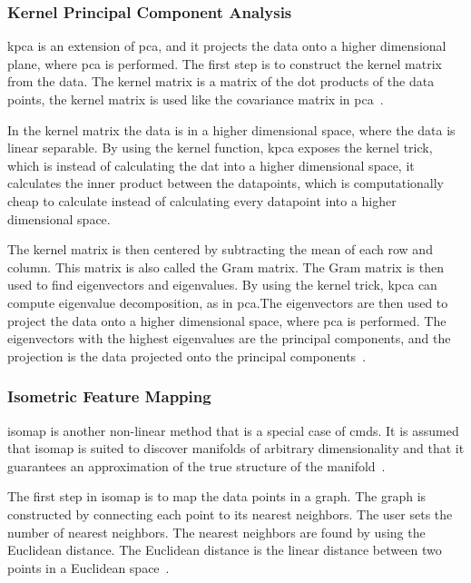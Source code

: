\subsubsection{Kernel Principal Component Analysis}\label{subsubsec:kernel-principal-component-analysis}
\gls{kpca} is an extension of \gls{pca}, and it projects the data onto a higher dimensional plane, where \gls{pca} is performed.
The first step is to construct the kernel matrix from the data. The kernel matrix is a matrix of the dot products of the data points, the kernel matrix is used like the covariance matrix in \gls{pca}~\cite{kernel-pca}.

In the kernel matrix the data is in a higher dimensional space, where the data is linear separable. By using the kernel function, \gls{kpca} exposes the kernel trick, which is instead of calculating the dat into a higher dimensional space, it calculates the inner product between the datapoints, which is computationally cheap to calculate instead of calculating every datapoint into a higher dimensional space.

The kernel matrix is then centered by subtracting the mean of each row and column. This matrix is also called the Gram matrix. The Gram matrix is then used to find eigenvectors and eigenvalues. By using the kernel trick, \gls{kpca} can compute eigenvalue decomposition, as in \gls{pca}.The eigenvectors are then used to project the data onto a higher dimensional space, where \gls{pca} is performed. The eigenvectors with the highest eigenvalues are the principal components, and the projection is the data projected onto the principal components~\cite{kernel-pca}.

\subsubsection{Isometric Feature Mapping}\label{subsubsec:isometric-feature-mapping}
\gls{isomap} is another non-linear method that is a special case of \gls{cmds}. It is assumed that \gls{isomap} is suited to discover manifolds of arbitrary dimensionality and that it guarantees an approximation of the true structure of the manifold~\cite{tennenbaum}.

The first step in \gls{isomap} is to map the data points in a graph. The graph is constructed by connecting each point to its nearest neighbors. The user sets the number of nearest neighbors. The nearest neighbors are found by using the Euclidean distance. The Euclidean distance is the linear distance between two points in a Euclidean space~\cite{Multidimensional-Scaling-Sammon-Mapping-and-Isomap}.

